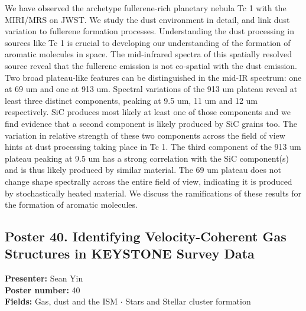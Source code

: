 We have observed the archetype fullerene-rich planetary nebula Tc 1 with the MIRI/MRS on JWST. We study the dust environment in detail, and link dust variation to fullerene formation processes. Understanding the dust processing in sources like Tc 1 is crucial to developing our understanding of the formation of aromatic molecules in space. The mid-infrared spectra of this spatially resolved source reveal that the fullerene emission is not co-spatial with the dust emission. Two broad plateau-like features can be distinguished in the mid-IR spectrum: one at 69 um and one at 913 um. Spectral variations of the 913 um plateau reveal at least three distinct components, peaking at 9.5 um, 11 um and 12 um respectively. SiC produces most likely at least one of those components and we find evidence that a second component is likely produced by SiC grains too. The variation in relative strength of these two components across the field of view hints at dust processing taking place in Tc 1. The third component of the 913 um plateau peaking at 9.5 um has a strong correlation with the SiC component(s) and is thus likely produced by similar material. The 69 um plateau does not change shape spectrally across the entire field of view, indicating it is produced by stochastically heated material. We discuss the ramifications of these results for the formation of aromatic molecules.

\hypertarget{poster-abstract-talk-165}{}\label{poster-abstract-page-talk-165}
\subsection*{Poster 40. Identifying Velocity-Coherent Gas Structures in KEYSTONE Survey Data}
\textbf{Presenter:} Sean Yin\\
\textbf{Poster number:} 40\\
\textbf{Fields:} Gas, dust and the ISM $\cdot$ Stars and Stellar cluster formation

